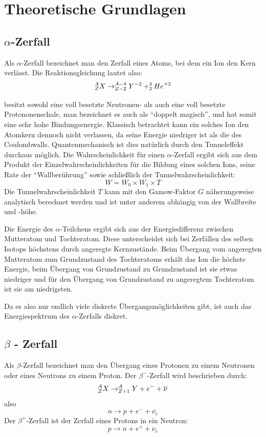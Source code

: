 \section{Theoretische Grundlagen}

\subsection{$\alpha$-Zerfall}
Als $\alpha$-Zerfall bezeichnet man den Zerfall eines Atoms, bei dem ein  Ion den Kern verlässt. Die Reaktionsgleichung lautet also:
$$ ^{A}_{Z}{X} \rightarrow ^{A-4}_{Z-2}{Y}^{-2} + ^{4}_{2}{He}^{+2} $$

 besitzt sowohl eine voll besetzte Neutronen- als auch eine voll besetzte Protononenschale, man bezeichnet es auch als "`doppelt magisch"', und hat somit eine sehr hohe Bindungsenergie. Klassisch betrachtet kann ein solches Ion den Atomkern dennoch nicht verlassen, da seine Energie niedriger ist als die des Coulombwalls. Quantenmechanisch ist dies natürlich durch den Tunneleffekt durchaus möglich. Die Wahrscheinlichkeit für einen $\alpha$-Zerfall ergibt sich aus dem Produkt der Einzelwahrscheinlichkeiten für die Bildung eines solchen Ions, seine Rate der "`Wallberührung"' sowie schließlich der Tunnelwahrscheinlichkeit:
$$ W = W_0 \times W_1 \times T $$
Die Tunnelwahrscheinlichkeit $T$ kann mit den Gamow-Faktor $G$ näherungsweise analytisch berechnet werden und ist unter anderem abhängig von der Wallbreite und -höhe. 

Die Energie des $\alpha$-Teilchens ergibt sich aus der Energiedifferenz zwischen Mutteratom und Tochteratom. Diese unterscheidet sich bei Zerfällen des selben Isotops höchstens durch angeregte Kernzustände. Beim Übergang vom angeregten Mutteratom zum Grundzustand des Tochteratoms erhält das Ion die höchste Energie, beim Übergang von Grundzustand zu Grundzustand ist sie etwas niedriger und für den Übergang von Grundzustand zu angeregtem Tochteratom ist sie am niedrigsten.

Da es also nur endlich viele diskrete Übergangsmöglichkeiten gibt, ist auch das Energiespektrum des $\alpha$-Zerfalls diskret.  

\subsection{$\beta$ - Zerfall}
Als $\beta$-Zerfall bezeichnet man den Übergang eines Protonen zu einem Neutronen oder eines Neutrons zu einem Proton. Der $\beta^-$-Zerfall wird beschrieben durch:
$$ ^{A}_{Z}{X} \rightarrow ^{A}_{Z+1}{Y} + e^- + \overline{\nu} $$
also
$$ n \rightarrow p + e^- + \overline{\nu_e} $$
Der $\beta^+$-Zerfall ist der Zerfall eines Protons in ein Neutron:
$$p \rightarrow n + e^+ + \nu_e$$

